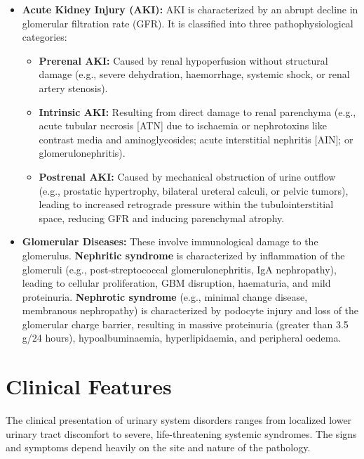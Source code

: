 \begin{itemize}
    \item \textbf{Acute Kidney Injury (AKI):} AKI is characterized by an abrupt decline in glomerular filtration rate (GFR). It is classified into three pathophysiological categories:
    \begin{itemize}
        \item \textbf{Prerenal AKI:} Caused by renal hypoperfusion without structural damage (e.g., severe dehydration, haemorrhage, systemic shock, or renal artery stenosis).
        \item \textbf{Intrinsic AKI:} Resulting from direct damage to renal parenchyma (e.g., acute tubular necrosis [ATN] due to ischaemia or nephrotoxins like contrast media and aminoglycosides; acute interstitial nephritis [AIN]; or glomerulonephritis).
        \item \textbf{Postrenal AKI:} Caused by mechanical obstruction of urine outflow (e.g., prostatic hypertrophy, bilateral ureteral calculi, or pelvic tumors), leading to increased retrograde pressure within the tubulointerstitial space, reducing GFR and inducing parenchymal atrophy.
    \end{itemize}
    \item \textbf{Glomerular Diseases:} These involve immunological damage to the glomerulus. \textbf{Nephritic syndrome} is characterized by inflammation of the glomeruli (e.g., post-streptococcal glomerulonephritis, IgA nephropathy), leading to cellular proliferation, GBM disruption, haematuria, and mild proteinuria. \textbf{Nephrotic syndrome} (e.g., minimal change disease, membranous nephropathy) is characterized by podocyte injury and loss of the glomerular charge barrier, resulting in massive proteinuria (greater than 3.5 g/24 hours), hypoalbuminaemia, hyperlipidaemia, and peripheral oedema.
\end{itemize}

\section*{Clinical Features}
The clinical presentation of urinary system disorders ranges from localized lower urinary tract discomfort to severe, life-threatening systemic syndromes. The signs and symptoms depend heavily on the site and nature of the pathology.

